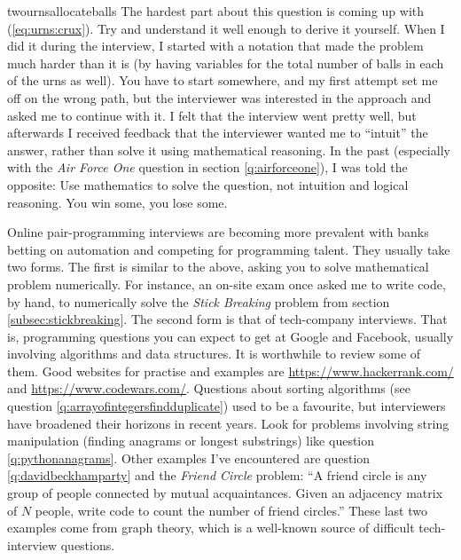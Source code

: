 \begin{answer}{twournsallocateballs}
The hardest part about this question is coming up with (\ref{eq:urns:crux}).
Try and understand it well enough to derive it yourself.
When I did it during the interview, I started with a notation that made the problem much harder than it is (by having variables for the total number of balls in each of the urns as well).
You have to start somewhere, and my first attempt set me off on the wrong path,
but the interviewer was interested in the approach and asked me to continue with it.
I felt that the interview went pretty well, but afterwards I received feedback that the interviewer wanted me to ``intuit'' the answer, rather than solve it using mathematical reasoning.
In the past (especially with the \emph{Air Force One} question in section \ref{q:airforceone}), I was told the opposite: Use mathematics to solve the question, not intuition and logical reasoning.
You win some, you lose some.

Online pair-programming interviews are becoming more prevalent with banks betting on automation and competing for programming talent.
They usually take two forms.
The first is similar to the above, asking you to solve mathematical problem numerically.
For instance, an on-site exam once asked me to write code, by hand, to numerically solve the \emph{Stick Breaking} problem from section \ref{subsec:stickbreaking}.
The second form is that of tech-company interviews.
That is, programming questions you can expect to get at Google and Facebook, usually involving algorithms and data structures.
It is worthwhile to review some of them.
Good websites for practise and examples are
\url{https://www.hackerrank.com/} and
\url{https://www.codewars.com/}.
Questions about sorting algorithms (see question \ref{q:arrayofintegersfindduplicate}) used to be a favourite, but interviewers have broadened their horizons in recent years.
Look for problems involving string manipulation (finding anagrams or longest substrings) like question \ref{q:pythonanagrams}.
Other examples I've encountered are question
\ref{q:davidbeckhamparty} and the \emph{Friend Circle} problem:
``A friend circle is any group of people connected by mutual acquaintances. Given an adjacency matrix of $N$ people, write code to count the number of friend circles.''
These last two examples come from graph theory, which is a well-known source of difficult tech-interview questions.


\end{answer}
